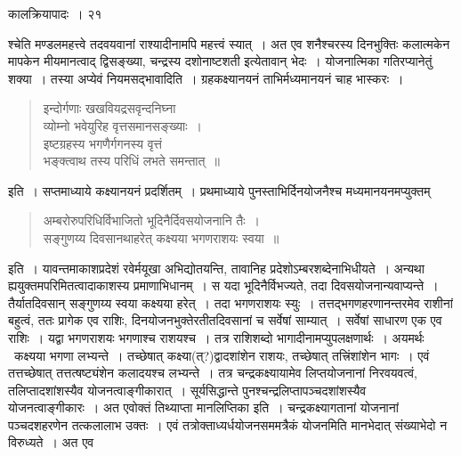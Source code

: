 \documentclass[11pt, openany]{book}
\begin{document}
{\newpage

\vspace{3cm}\hspace{4cm} कालक्रियापादः~।\hspace{4cm} २१

\vspace{0.3cm}
\noindent श्चेति मण्डलमहत्त्वे तदवयवानां राश्यादीनामपि महत्त्वं स्यात्~। अत एव शनैश्चरस्य दिनभुक्तिः कलात्मकेन मापकेन मीयमानत्वाद् द्विसङ्ख्या, चन्द्रस्य दशोनाष्टशती इत्येतावान् भेदः~। योजनात्मिका गतिरप्यानेतुं शक्या~। तस्या अप्येवं नियमसद्भावादिति~। ग्रहकक्ष्यानयनं ताभिर्मध्यमानयनं चाह भास्करः~।

\begin{quote}
{\qt इन्दोर्गणाः खखवियद्रसवृन्दनिघ्ना\\
व्योम्नो भवेयुरिह वृत्तसमानसङ्ख्याः~।\\
इष्टग्रहस्य भगणैर्गगनस्य वृत्तं\\
भङ्क्त्वाथ तस्य परिधिं लभते समन्तात्~॥}
\end{quote}

इति~। सप्तमाध्याये कक्ष्यानयनं प्रदर्शितम्~। प्रथमाध्याये पुनस्ताभिर्दिनयोजनैश्च मध्यमानयनमप्युक्तम्\textendash 

\begin{quote}
{\qt अम्बरोरुपरिधिर्विभाजितो भूदिनैर्दिवसयोजनानि तैः~।\\
सङ्गुणय्य दिवसानथाहरेत् कक्ष्यया भगणराशयः स्वया~॥}
\end{quote}

\noindent इति~। यावन्तमाकाशप्रदेशं रवेर्मयूखा अभिद्योतयन्ति, तावानिह प्रदेशोऽम्बरशब्देनाभिधीयते~। अन्यथा ह्ययुक्तमपरिमितत्वादाकाशस्य प्रमाणाभिधानम्~। स यदा भूदिनैर्विभज्यते, तदा दिवसयोजनान्यवाप्यन्ते~। तैर्यातदिवसान् सङ्गुणय्य स्वया कक्ष्यया हरेत्~। तदा भगणराशयः स्युः~। तत्तद्भगणहरणानन्तरमेव राशीनां बहुत्वं, ततः प्रागेक एव राशिः, दिनयोजनभुक्तेरतीतदिवसानां च सर्वेषां साम्यात्~। सर्वेषां साधारण एक एव राशिः~। यद्वा भगणराशयः भगणाश्च राशयश्च~। तत्र राशिशब्दो भागादीनामप्युपलक्षणार्थः~। अयमर्थः \textendash\ कक्ष्यया भगणा लभ्यन्ते~। तच्छेषात् कक्ष्या(त्?)द्वादशांशेन राशयः, तच्छेषात् तत्त्रिंशांशेन भागः~। एवं
तत्तच्छेषात् तत्तत्षष्ट्यंशेन कलादयश्च लभ्यन्ते~। तत्र चन्द्रकक्ष्यायामेव लिप्तयोजनानां निरवयवत्वं, तलिप्तादशांशस्यैव योजनत्वाङ्गीकारात्~। सूर्यसिद्धान्ते पुनश्चन्द्रलिप्तापञ्चदशांशस्यैव योजनत्वाङ्गीकारः~। अत एवोक्तं {\qt तिथ्याप्ता मानलिप्तिका} इति~। चन्द्रकक्ष्यागतानां योजनानां
पञ्चदशहरणेन तत्कलालाभ उक्तः~। एवं तत्रोक्ताध्यर्धयोजनसममत्रैकं योजनमिति मानभेदात् संख्याभेदो न विरुध्यते~। अत एव\textendash 

}
\end{document}
